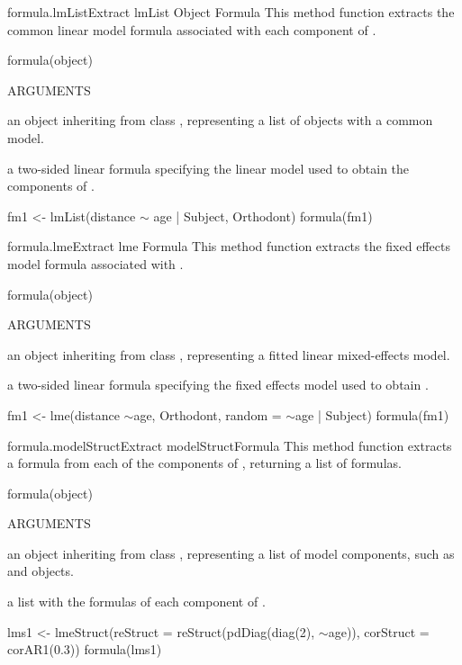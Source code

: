\documentclass[pdftex]{article} \usepackage{url,graphicx}
\renewcommand{\Twiddle}{\mbox{\(\sim\)}}
\begin{document}
\begin{Helpfile}{formula.lmList}{Extract lmList Object Formula}
This method function extracts the common linear model formula
associated with each  component of .
\begin{Example}
formula(object)
\end{Example}
\begin{Argument}{ARGUMENTS}
\item[\Co{object:}]
an object inheriting from class , representing
a list of  objects with a common model.
\end{Argument}
a two-sided linear formula specifying the linear model used to
obtain the  components of .
\need 15pt
\vspace{-16pt}
\begin{Example}
fm1 <- lmList(distance {\Twiddle} age | Subject, Orthodont)
formula(fm1)
\end{Example}
\end{Helpfile}
\begin{Helpfile}{formula.lme}{Extract lme Formula}
This method function extracts the fixed effects model formula
associated with .
\begin{Example}
formula(object)
\end{Example}
\begin{Argument}{ARGUMENTS}
\item[\Co{object:}]
an object inheriting from class , representing
a fitted linear mixed-effects model.
\end{Argument}
a two-sided linear formula specifying the fixed effects model used to
obtain .
\need 15pt
\vspace{-16pt} 
\begin{Example}
fm1 <- lme(distance \Twiddle age, Orthodont, random = \Twiddle age | Subject)
formula(fm1)
\end{Example}
\end{Helpfile}
\begin{Helpfile}{formula.modelStruct}{Extract modelStructFormula}
This method function extracts a formula from each of the 
components of , returning a list of formulas.
\begin{Example}
formula(object)
\end{Example}
\begin{Argument}{ARGUMENTS}
\item[\Co{object:}]
an object inheriting from class ,
representing a list of model components, such as  and
 objects.
\end{Argument}
a list with the formulas of each component of .
\need 15pt
\vspace{-16pt} 
\begin{Example}
lms1 <- lmeStruct(reStruct = reStruct(pdDiag(diag(2), \Twiddle age)),
   corStruct = corAR1(0.3))
formula(lms1)
\end{Example}
\end{Helpfile}
\end{document}
